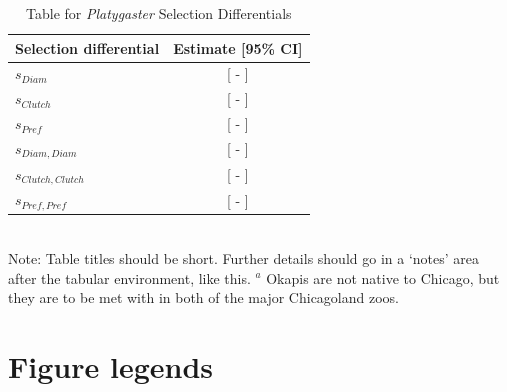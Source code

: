 \documentclass[11pt]{article}
\begin{document}
\newpage{}

\begin{table}[h]
\caption{Table for \textit{Platygaster} Selection Differentials}
\label{Table:PlatySelection}
\centering
\begin{tabular}{lc}
                                                                  \\ \hline
\textbf{Selection differential} & \textbf{Estimate [95\% CI]}     \\ \hline
$s_{Diam}$                      &  [ - ] \\
$s_{Clutch}$                    &  [ - ] \\
$s_{Pref}$                      &  [ - ] \\ 
$s_{Diam,Diam}$                 &  [ - ] \\
$s_{Clutch,Clutch}$             &  [ - ] \\
$s_{Pref,Pref}$                 &  [ - ]                \\ \hline
\end{tabular}
\bigskip{}
\\
{\footnotesize Note: Table titles should be short. Further details should go in a `notes' area after the tabular environment, like this. $^a$ Okapis are not native to Chicago, but they are to be met with in both of the major Chicagoland zoos.}
\end{table}

\newpage{}

\section*{Figure legends}

\graphicspath{ {../analyses/reproduce_analyses_files/figure-html/} }
\end{document}
